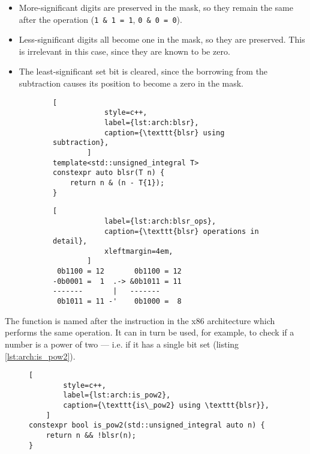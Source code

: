 \begin{itemize}
    \item
        More-significant digits are preserved in the mask, so they remain the
        same after the operation (\texttt{1 \& 1 = 1}, \texttt{0 \& 0 = 0}).
    \item
        Less-significant digits all become one in the mask, so they are
        preserved.  This is irrelevant in this case, since they are known to be
        zero.
    \item
        The least-significant set bit is cleared, since the borrowing from the
        subtraction causes its position to become a zero in the mask.
\end{itemize}

\begin{figure}[ht]
    \centering
    \vspace{-\baselineskip}
    \begin{subfigure}[t]{0.45\textwidth}
        \begin{lstlisting}[
            style=c++,
            label={lst:arch:blsr},
            caption={\texttt{blsr} using subtraction},
        ]
template<std::unsigned_integral T>
constexpr auto blsr(T n) {
    return n & (n - T{1});
}
        \end{lstlisting}
    \end{subfigure}
    \begin{subfigure}[t]{0.45\textwidth}
        \begin{lstlisting}[
            label={lst:arch:blsr_ops},
            caption={\texttt{blsr} operations in detail},
            xleftmargin=4em,
        ]
 0b1100 = 12       0b1100 = 12
-0b0001 =  1  .-> &0b1011 = 11
-------       |   -------
 0b1011 = 11 -'    0b1000 =  8
        \end{lstlisting}
    \end{subfigure}
    \vspace{-\baselineskip}
\end{figure}

The function is named after the instruction in the x86 architecture which
performs the same operation.  It can in turn be used, for example, to check if a
number is a power of two --- i.e. if it has a single bit set (listing
\ref{lst:arch:is_pow2}).

\begin{figure}[ht]
    \vspace{-\baselineskip}
    \begin{lstlisting}[
        style=c++,
        label={lst:arch:is_pow2},
        caption={\texttt{is\_pow2} using \texttt{blsr}},
    ]
constexpr bool is_pow2(std::unsigned_integral auto n) {
    return n && !blsr(n);
}
    \end{lstlisting}
    \vspace{-2\baselineskip}
\end{figure}

